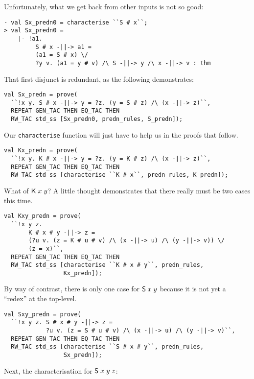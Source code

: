 \documentclass[12pt]{article}
\newcommand{\KC}{\con{K}}
\newcommand{\SC}{\con{S}}
\begin{document}
Unfortunately, what we get back from other inputs is not so good:
\begin{session}\begin{verbatim}
- val Sx_predn0 = characterise ``S # x``;
> val Sx_predn0 =
    |- !a1.
         S # x -||-> a1 =
         (a1 = S # x) \/
         ?y v. (a1 = y # v) /\ S -||-> y /\ x -||-> v : thm
\end{verbatim}\end{session}
That first disjunct is redundant, as the following demonstrates:
\begin{session}\begin{verbatim}
val Sx_predn = prove(
  ``!x y. S # x -||-> y = ?z. (y = S # z) /\ (x -||-> z)``,
  REPEAT GEN_TAC THEN EQ_TAC THEN
  RW_TAC std_ss [Sx_predn0, predn_rules, S_predn]);
\end{verbatim}\end{session}
Our \texttt{characterise} function will just have to help us in the
proofs that follow.
\begin{session}\begin{verbatim}
val Kx_predn = prove(
  ``!x y. K # x -||-> y = ?z. (y = K # z) /\ (x -||-> z)``,
  REPEAT GEN_TAC THEN EQ_TAC THEN
  RW_TAC std_ss [characterise ``K # x``, predn_rules, K_predn]);
\end{verbatim}\end{session}
What of $\KC\;x\;y$?  A little thought demonstrates that there really
must be two cases this time.
\begin{session}\begin{verbatim}
val Kxy_predn = prove(
  ``!x y z.
       K # x # y -||-> z =
       (?u v. (z = K # u # v) /\ (x -||-> u) /\ (y -||-> v)) \/
       (z = x)``,
  REPEAT GEN_TAC THEN EQ_TAC THEN
  RW_TAC std_ss [characterise ``K # x # y``, predn_rules,
                 Kx_predn]);
\end{verbatim}\end{session}
By way of contrast, there is only one case for $\SC\;x\;y$ because it
is not yet a ``redex'' at the top-level.
\begin{session}\begin{verbatim}
val Sxy_predn = prove(
  ``!x y z. S # x # y -||-> z =
            ?u v. (z = S # u # v) /\ (x -||-> u) /\ (y -||-> v)``,
  REPEAT GEN_TAC THEN EQ_TAC THEN
  RW_TAC std_ss [characterise ``S # x # y``, predn_rules,
                 Sx_predn]);
\end{verbatim}\end{session}
Next, the characterisation for $\SC\;x\;y\;z$:
\end{document}
